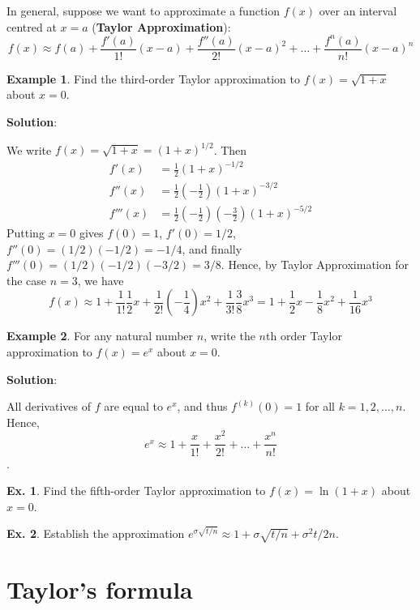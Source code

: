 \documentclass[10pt,a4paper]{book}
\theoremstyle{definition}\newtheorem{definition}{Definition}
\theoremstyle{definition}\newtheorem{fact}{Fact}
\theoremstyle{definition}\newtheorem{ex}{Ex.}
\theoremstyle{definition}\newtheorem{project}{Project}
\theoremstyle{definition}\newtheorem{problem}{Problem}
\theoremstyle{definition}\newtheorem{example}{Example}
\numberwithin{theorem}{chapter}
\numberwithin{corollary}{chapter}
\numberwithin{assumption}{chapter}
\numberwithin{definition}{chapter}
\numberwithin{prop}{chapter}
\numberwithin{notation}{chapter}
\numberwithin{problem}{chapter}
\numberwithin{example}{chapter}
\numberwithin{fact}{chapter}
\numberwithin{ex}{chapter}
\begin{document}
	In general, suppose we want to approximate a function $f(x)$ over an interval centred at $x = a$ (\textbf{Taylor Approximation}):
	$$f(x) \approx f(a) + \frac{f'(a)}{1!}(x-a) + \frac{f''(a)}{2!}(x-a)^2 + \dots + \frac{f^{n}(a)}{n!}(x-a)^n$$
	
	\begin{example}
		Find the third-order Taylor approximation to $f(x)=\sqrt{1+x}$ about $x=0$.
		
		\textbf{Solution}:
		
		We write $f(x)=\sqrt{1+x}=(1+x)^{1/2}$. Then
		\begin{align*}
			f'(x)   & = \frac{1}{2}(1+x)^{-1/2}                                                         \\
			f''(x)  & = \frac{1}{2} \left( -\frac{1}{2} \right) (1+x)^{-3/2}                            \\
			f'''(x) & = \frac{1}{2} \left( -\frac{1}{2} \right) \left( -\frac{3}{2} \right)(1+x)^{-5/2} 
		\end{align*}
		Putting $x=0$ gives $f(0)=1$, $f'(0)=1/2$, $f''(0)=(1/2)(-1/2)=-1/4$, and finally $f'''(0) = (1/2)(-1/2)(-3/2) = 3/8$. Hence, by Taylor Approximation for the case $n = 3$, we have
		$$f(x) \approx 1+ \frac{1}{1!}\frac{1}{2}x + \frac{1}{2!}\left(-\frac{1}{4}\right)x^2 + \frac{1}{3!}\frac{3}{8}x^3 = 1+\frac{1}{2}x-\frac{1}{8}x^2 + \frac{1}{16}x^3$$
	\end{example}
	
	\begin{example}
		For any natural number $n$, write the $n$th order Taylor approximation to $f (x) = e^x$ about $x = 0$.
		
		\textbf{Solution}:
		
		All derivatives of $f$ are equal to $e^x$, and thus $f^{(k)}(0) = 1$ for all $k = 1, 2, \dots , n$. Hence,
		$$e^x \approx 1 + \frac{x}{1!} + \frac{x^2}{2!} + \dots + \frac{x^n}{n!}$$.
	\end{example}
	
	\begin{ex}
		Find the fifth-order Taylor approximation to $f (x) = \ln(1 + x)$ about $x = 0$.
	\end{ex}
	
	\begin{ex}
		Establish the approximation $e^{\sigma \sqrt{t/n}} \approx 1+\sigma \sqrt{t/n} + \sigma^2 t/2n$.
	\end{ex}
	
	\section{Taylor's formula}
	
\end{document}
